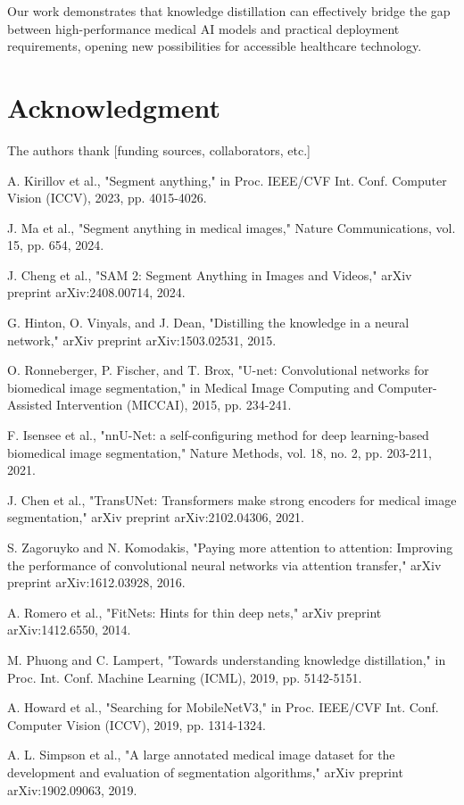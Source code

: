 \documentclass[conference]{IEEEtran}
\begin{document}
Our work demonstrates that knowledge distillation can effectively bridge the gap between high-performance medical AI models and practical deployment requirements, opening new possibilities for accessible healthcare technology.

\section*{Acknowledgment}

The authors thank [funding sources, collaborators, etc.]

\begin{thebibliography}{00}
 A. Kirillov et al., "Segment anything," in Proc. IEEE/CVF Int. Conf. Computer Vision (ICCV), 2023, pp. 4015-4026.

 J. Ma et al., "Segment anything in medical images," Nature Communications, vol. 15, pp. 654, 2024.

 J. Cheng et al., "SAM 2: Segment Anything in Images and Videos," arXiv preprint arXiv:2408.00714, 2024.

 G. Hinton, O. Vinyals, and J. Dean, "Distilling the knowledge in a neural network," arXiv preprint arXiv:1503.02531, 2015.

 O. Ronneberger, P. Fischer, and T. Brox, "U-net: Convolutional networks for biomedical image segmentation," in Medical Image Computing and Computer-Assisted Intervention (MICCAI), 2015, pp. 234-241.

 F. Isensee et al., "nnU-Net: a self-configuring method for deep learning-based biomedical image segmentation," Nature Methods, vol. 18, no. 2, pp. 203-211, 2021.

 J. Chen et al., "TransUNet: Transformers make strong encoders for medical image segmentation," arXiv preprint arXiv:2102.04306, 2021.

 S. Zagoruyko and N. Komodakis, "Paying more attention to attention: Improving the performance of convolutional neural networks via attention transfer," arXiv preprint arXiv:1612.03928, 2016.

 A. Romero et al., "FitNets: Hints for thin deep nets," arXiv preprint arXiv:1412.6550, 2014.

 M. Phuong and C. Lampert, "Towards understanding knowledge distillation," in Proc. Int. Conf. Machine Learning (ICML), 2019, pp. 5142-5151.

 A. Howard et al., "Searching for MobileNetV3," in Proc. IEEE/CVF Int. Conf. Computer Vision (ICCV), 2019, pp. 1314-1324.

 A. L. Simpson et al., "A large annotated medical image dataset for the development and evaluation of segmentation algorithms," arXiv preprint arXiv:1902.09063, 2019.
\end{thebibliography}
\end{document}
